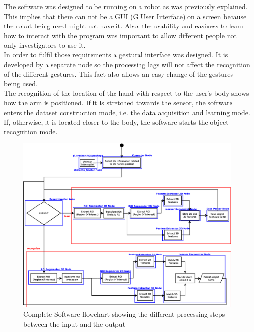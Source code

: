 The software was designed to be running on a robot as was previously explained. This implies that there can not be a GUI (G User Interface) on a screen because the robot being used might not have it. Also, the usability and easiness to learn how to interact with the program was important to allow different people not only investigators to use it. 
\\

In order to fulfil those requirements a gestural interface was designed. It is developed by a separate node so the processing lags will not affect the recognition of the different gestures. This fact also allows an easy change of the gestures being used. 
\\

The recognition of the location of the hand with respect to the user's body shows how the arm is positioned. If it is stretched towards the sensor, the software enters the dataset construction mode, i.e. the data acquisition and learning mode. If, otherwise, it is located closer to the body, the software starts the object recognition mode. 
\\

\begin{figure}[h]
	\begin{center}
\includegraphics[scale=0.3]{img/diagrams/flowcharts.eps}
	\caption[Software flowchart]{Complete Software flowchart showing the different processing steps between the input and the output}
	\end{center}
\end{figure}


